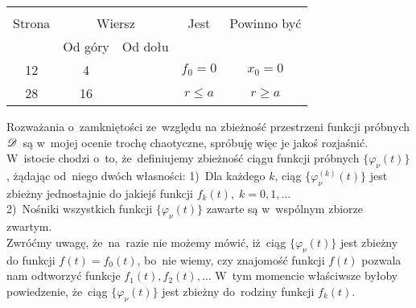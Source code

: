 \documentclass[a4paper,11pt]{article}
\begin{document}
\vspace{\spaceTwo}














\begin{center}

  \begin{tabular}{|c|c|c|c|c|}
    \hline
    & \multicolumn{2}{c|}{} & & \\
    Strona & \multicolumn{2}{c|}{Wiersz} & Jest
                              & Powinno być \\ \cline{2-3}
    & Od góry & Od dołu & & \\
    \hline
    12  &  4 & & $f_{ 0 } = 0$ & $x_{ 0 } = 0$ \\
    28  & 16 & & $r \leq a$ & $r \geq a$ \\
    \hline
  \end{tabular}

\end{center}

\vspace{\spaceTwo}










\newpage
{}




\start {} Rozważania o~zamkniętości ze~względu na zbieżność
przestrzeni funkcji próbnych $\mathcal{D}$~są w~mojej ocenie trochę
chaotyczne, spróbuję więc je jakoś rozjaśnić. W~istocie chodzi o~to,
że~definiujemy zbieżność ciągu funkcji próbnych
$\{ \varphi_{ \nu }( t ) \}$, żądając od~niego dwóch własności:
1)~Dla każdego $k$, ciąg $\{ \varphi_{ \nu }^{ ( k ) }( t ) \}$ jest
zbieżny jednostajnie do jakiejś funkcji
$f_{ k }( t ), \; k = 0, 1, \ldots$ \\
2)~Nośniki wszystkich funkcji $\{ \varphi_{ \nu }( t ) \}$ zawarte są
w~wspólnym zbiorze zwartym. \\
Zwróćmy uwagę, że~na~razie nie możemy mówić, iż~ciąg
$\{ \varphi_{ \nu }( t ) \}$ jest zbieżny do funkcji
$f( t ) = f_{ 0 }( t )$, bo~nie wiemy, czy znajomość funkcji $f( t )$
pozwala nam odtworzyć funkcje $f_{ 1 }( t ), f_{ 2 }( t ), \ldots$ W~tym
momencie właściwsze byłoby powiedzenie, że~ciąg
$\{ \varphi_{ \nu }( t ) \}$ jest zbieżny do~rodziny funkcji
$f_{ k }( t )$.
\end{document}
